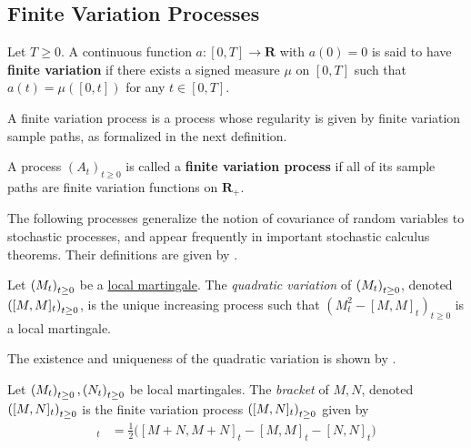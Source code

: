 \subsection{Finite Variation Processes}\label{app:finite-variation}
\begin{definition}
  Let $T\geq 0$. A continuous function $a : [0,T]\to\mathbf{R}$ with
  $a(0) = 0$ is said to have \textbf{finite variation} if there exists
  a signed measure $\mu$ on $[0,T]$ such that $a(t) = \mu([0,t])$ for
  any $t\in [0,T]$.
\end{definition}

A finite variation process is a process whose regularity is given by
finite variation sample paths, as formalized in the next definition.

\begin{definition}
  A process $(A_t)_{t\geq 0}$ is called a \textbf{finite variation
    process} if all of its sample paths are finite variation functions
  on $\mathbf{R}_+$.
\end{definition}

The following processes generalize the notion of covariance of random variables
to stochastic processes, and appear frequently in important stochastic calculus
theorems. Their definitions are given by \citet{le2016brownian}.

\begin{definition}\label{def:quadratic-variation}
  Let $\indexedabove{t}{M}$ be a \hyperref[def:local-martingale]{local
  martingale}. The \emph{quadratic variation} of $\indexedabove{t}{M}$,
  denoted $\indexedabove{t}{[M,M]}$, is the unique increasing process such
  that $(M^2_t - [M,M]_t)_{t\geq 0}$ is a local martingale.
\end{definition}

\begin{remark}
  The existence and uniqueness of the quadratic variation is shown by
  \citet[Theorem 4.9]{le2016brownian}.
\end{remark}

\begin{definition}\label{def:bracket}
  Let $\indexedabove{t}{M},\indexedabove{t}{N}$ be local martingales. The
  \emph{bracket} of $M,N$, denoted $\indexedabove{t}{[M,N]}$ is the finite
  variation process $\indexedabove{t}{[M,N]}$ given by
  \begin{align*}
    [M,N]_t &= \frac{1}{2}\bigg([M+N,M+N]_t - [M,M]_t - [N,N]_t\bigg)
  \end{align*}
\end{definition}

